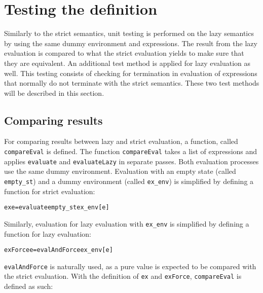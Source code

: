 \section{Testing the definition}

Similarly to the strict semantics, unit testing is performed on the lazy
semantics by using the same dummy environment and expressions. 
The result from the lazy evaluation is compared to what the strict evaluation
yields to make sure that they are equivalent. An additional test method is
applied for lazy evaluation as well. This testing consists of checking for
termination in evaluation of expressions that normally do not terminate with
the strict semantics. These two test methods will be described in this section.

\subsection{Comparing results}
\label{lazy:compres}
For comparing results between lazy and strict evaluation, a function, called
\texttt{compareEval} is defined. The function \texttt{compareEval} takes a list
of expressions and applies \texttt{evaluate} and \texttt{evaluateLazy}
in separate passes. Both evaluation processes use the same dummy environment.
Evaluation with an empty state (called \texttt{empty\_st}) and
a dummy environment (called \texttt{ex\_env}) is simplified by defining a
function for strict evaluation:

\begin{alltt}
  ex e = evaluate empty_st ex_env [e]
\end{alltt}

\noindent Similarly, evaluation for lazy evaluation with \texttt{ex\_env} is
simplified by defining a function for lazy evaluation:

\begin{alltt}
  exForce e = evalAndForce ex_env [e]
\end{alltt}

\noindent \texttt{evalAndForce} is naturally used, as a pure value is expected
to be compared with the strict evaluation. With the definition of \texttt{ex}
and \texttt{exForce}, \texttt{compareEval} is defined as such:

